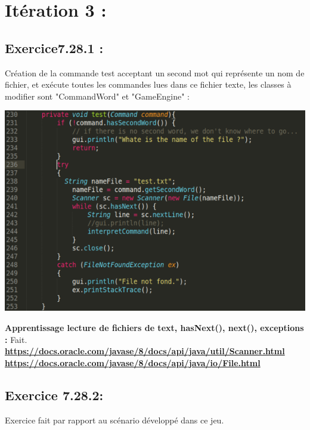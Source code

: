 \documentclass[french,10pt,a4paper]{report}
\begin{document}
\section{\textcolor{rr}{Itération 3 :}}
\subsection{\textcolor{bb}{Exercice7.28.1 :}}
Création de la commande test acceptant un second mot qui représente un nom de fichier, et exécute toutes les commandes lues dans ce fichier texte, les classes à modifier  sont "CommandWord" et "GameEngine" :
\begin{center}
	\includegraphics[scale=0.4]{captures/it3_1.png}
\end{center}
\textbf{\textcolor{gg}{Apprentissage lecture de fichiers de text, hasNext(), next(), exceptions :}} Fait.\\
\textbf{\textcolor{bb}{\href{https://docs.oracle.com/javase/8/docs/api/java/util/Scanner.html}{https://docs.oracle.com/javase/8/docs/api/java/util/Scanner.html}}}\\
\textbf{\textcolor{bb}{\href{https://docs.oracle.com/javase/8/docs/api/java/io/File.html}{https://docs.oracle.com/javase/8/docs/api/java/io/File.html}}}

\subsection{\textcolor{bb}{Exercice 7.28.2:}}
Exercice fait par rapport au scénario développé dans ce jeu.
\end{document}
